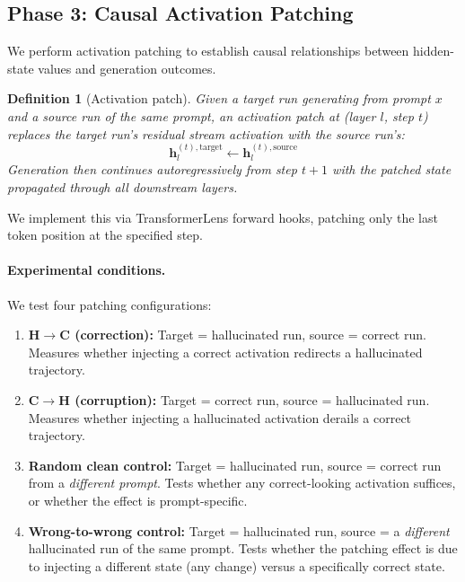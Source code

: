 \documentclass[11pt,a4paper]{article}
\newtheorem{definition}{Definition}
\begin{document}
\subsection{Phase 3: Causal Activation Patching}
\label{sec:patching}

We perform activation patching \cite{meng2022locating} to establish causal relationships between hidden-state values and generation outcomes.

\begin{definition}[Activation patch]
Given a \emph{target run} generating from prompt $x$ and a \emph{source run} of the same prompt, an activation patch at (layer $l$, step $t$) replaces the target run's residual stream activation with the source run's:
\begin{equation}
    \mathbf{h}_l^{(t),\text{target}} \leftarrow \mathbf{h}_l^{(t),\text{source}}
\end{equation}
Generation then continues autoregressively from step $t+1$ with the patched state propagated through all downstream layers.
\end{definition}

We implement this via TransformerLens forward hooks, patching only the last token position at the specified step.

\paragraph{Experimental conditions.} We test four patching configurations:

\begin{enumerate}
    \item \textbf{H$\to$C (correction):} Target = hallucinated run, source = correct run. Measures whether injecting a correct activation redirects a hallucinated trajectory.
    \item \textbf{C$\to$H (corruption):} Target = correct run, source = hallucinated run. Measures whether injecting a hallucinated activation derails a correct trajectory.
    \item \textbf{Random clean control:} Target = hallucinated run, source = correct run from a \emph{different prompt}. Tests whether any correct-looking activation suffices, or whether the effect is prompt-specific.
    \item \textbf{Wrong-to-wrong control:} Target = hallucinated run, source = a \emph{different} hallucinated run of the same prompt. Tests whether the patching effect is due to injecting a different state (any change) versus a specifically correct state.
\end{enumerate}
\end{document}
